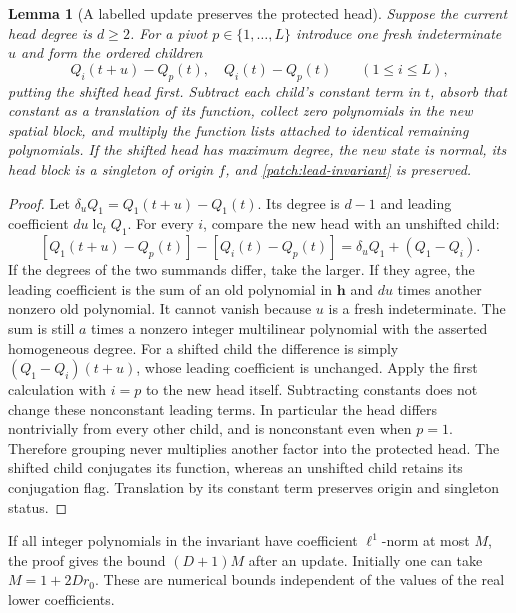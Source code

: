 \documentclass[11pt]{article}
\newtheorem{lemma}[lemma]{Lemma}
\theoremstyle{definition}
\begin{document}
\begin{lemma}[A labelled update preserves the protected head]\label{patch:pet-update}
Suppose the current head degree is $d\geq2$.  For a pivot $p\in\{1,\ldots,L\}$ introduce one
fresh indeterminate $u$ and form the ordered children
\[
 Q_i(t+u)-Q_p(t),\quad Q_i(t)-Q_p(t)\qquad(1\leq i\leq L),
\]
putting the shifted head first.  Subtract each child's constant term in $t$, absorb that
constant as a translation of its function, collect zero polynomials in the new spatial block,
and multiply the function lists attached to identical remaining polynomials.
If the shifted head has maximum degree, the new state is normal, its head block is a
singleton of origin $f$, and \eqref{patch:lead-invariant} is preserved.
\end{lemma}
\begin{proof}
Let $\delta_u Q_1=Q_1(t+u)-Q_1(t)$.  Its degree is $d-1$ and leading coefficient
$d u\operatorname{lc}_tQ_1$.  For every $i$, compare the new head with an unshifted child:
\[
 [Q_1(t+u)-Q_p(t)]-[Q_i(t)-Q_p(t)]
       =\delta_uQ_1+(Q_1-Q_i).
\]
If the degrees of the two summands differ, take the larger.  If they agree, the leading
coefficient is the sum of an old polynomial in $\mathbf h$ and $du$ times another nonzero
old polynomial.  It cannot vanish because $u$ is a fresh indeterminate.  The sum is still
$a$ times a nonzero integer multilinear polynomial with the asserted homogeneous degree.
For a shifted child the difference is simply $(Q_1-Q_i)(t+u)$, whose leading coefficient is
unchanged.  Apply the first calculation with $i=p$ to the new head itself.
Subtracting constants does not change these nonconstant leading terms.
In particular the head differs nontrivially from every other child, and is nonconstant even
when $p=1$.  Therefore grouping never multiplies another factor into the protected head.
The shifted child conjugates its function, whereas an unshifted child retains its conjugation
flag.  Translation by its constant term preserves origin and singleton status.
\end{proof}
If all integer polynomials in the invariant have coefficient $\ell^1$-norm at most $M$,
the proof gives the bound $(D+1)M$ after an update.  Initially one can take
$M=1+2Dr_0$.  These are numerical bounds independent of the values of the real lower coefficients.
\end{document}
